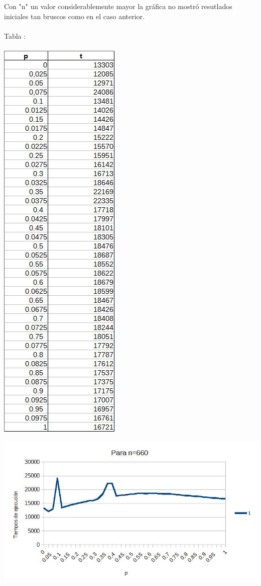 \documentclass[12pt,letterpaper]{scrartcl}
\begin{document}
Con "n" un valor considerablemente mayor la gráfica no mostró resutlados iniciales tan bruscos como en el caso anterior.
\\\\
Tabla :
\\\\
\includegraphics[scale=0.45]{2}

\includegraphics[scale=0.55]{nn}
\newpage
\end{document}
